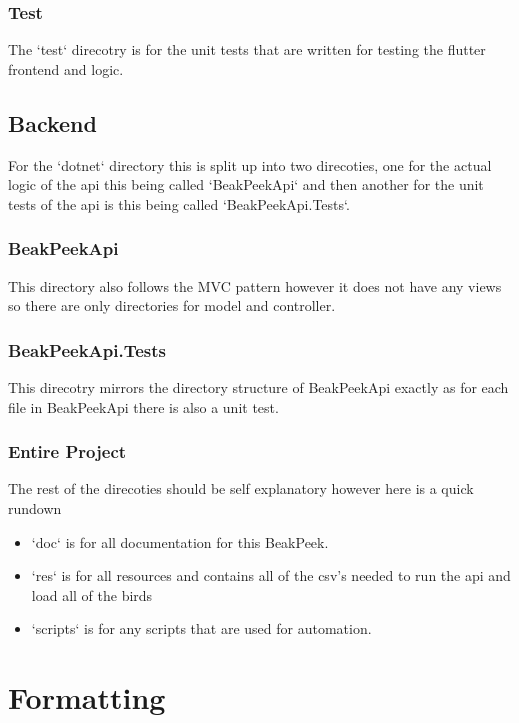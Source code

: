 \documentclass{article}
\begin{document}
\subsubsection{Test}

The `test` direcotry is for the unit tests that are written for testing the flutter frontend and logic.

\subsection{Backend}

For the `dotnet` directory this is split up into two direcoties, one for the actual logic of the api
this being called `BeakPeekApi` and then another for the unit tests of the api is this being called `BeakPeekApi.Tests`. 

\subsubsection{BeakPeekApi}

This directory also follows the MVC pattern however it does not have any views so there are only directories for model and
controller.

\subsubsection{BeakPeekApi.Tests}

This direcotry mirrors the directory structure of BeakPeekApi exactly as for each file in BeakPeekApi there
is also a unit test.

\subsubsection{Entire Project}

The rest of the direcoties should be self explanatory however here is a quick rundown

\begin{itemize}
    \item `doc` is for all documentation for this BeakPeek.
    \item `res` is for all resources and contains all of the csv's needed to run the api and load all of the birds
    \item `scripts` is for any scripts that are used for automation.
\end{itemize}

\section{Formatting}
\end{document}
